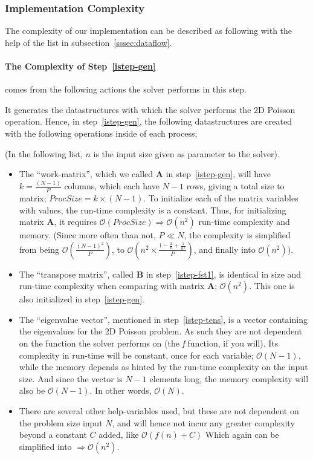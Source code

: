 \documentclass[fontsize=11pt,paper=a4,titlepage]{article}
\begin{document}
\subsubsection{Implementation Complexity}

The complexity of our implementation can be described as following with the help
of the list in subsection~\ref{sssec:dataflow}.

\paragraph{The Complexity of Step~\ref{istep-gen}} comes from the following
actions the solver performs in this step.

It generates the datastructures with which the solver performs the 2D Poisson
operation. Hence, in step~\ref{istep-gen}, the following datastructures are
created with the following operations inside of each process;

(In the following list, $n$ is the input size given as parameter to the solver).
\begin{itemize}
	\item The ``work-matrix'', which we called $\mathbf{A}$ in
	step~\ref{istep-gen}, will have $k = \frac{(N-1)}{P}$ columns, which each
	have $N-1$ rows, giving a total size to matrix; $ProcSize = k\times(N-1)$.
	To initialize each of the matrix variables with values, the run-time
	complexity is a constant. Thus, for initializing matrix $\mathbf{A}$, it
	requires $\mathcal{O}(ProcSize)\Rightarrow \mathcal{O}(n^2)$ run-time
	complexity and memory. (Since more often than not, $P \ll N$, the complexity
	is simplified from being $\mathcal{O}(\frac{(N-1)^2}{P})$, to $\mathcal
	{O}(n^2\times \frac{1-\frac{2}{n}+\frac{1}{n^2}}{P})$, and finally into
	$\mathcal{O}(n^2)$).

	\item The ``transpose matrix'', called $\mathbf{B}$ in
	step~\ref{istep-fst1}, is identical in size and run-time complexity when
	comparing with matrix $\mathbf{A}$; $\mathcal{O}(n^2)$. This one is also
	initialized in step~\ref{istep-gen}.

	\item The ``eigenvalue vector'', mentioned in step~\ref{istep-tens}, is a
	vector containing the eigenvalues for the 2D Poisson problem. As such they
	are not dependent on the function the solver performs on (the \emph{f}
	function, if you will). Its complexity in run-time will be constant, once
	for each variable; $\mathcal{O}(N-1)$, while the memory depends as hinted
	by the run-time complexity on the input size. And since the vector is $N-1$
	elements long, the memory complexity will also be $\mathcal{O}(N-1)$.
	In other words, $\mathcal{O}(N)$.

	\item There are several other help-variables used, but these are not
	dependent on the problem size input $N$, and will hence not incur any
	greater complexity beyond a constant $C$ added, like $\mathcal{O}(f(n) + C)$
	Which again can be simplified into $\Rightarrow \mathcal{O}(n^2)$.
\end{itemize}
\end{document}
